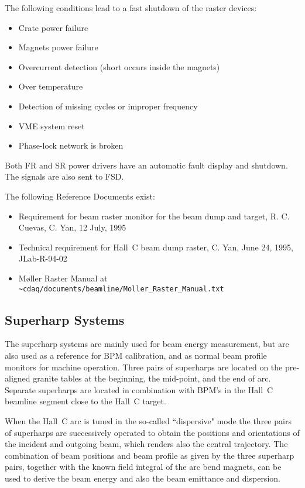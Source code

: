 {The following conditions lead to a fast shutdown of the raster devices:
\begin{itemize}
\item{Crate power failure}
\item{Magnets power failure}
\item{Overcurrent detection (short occurs inside the magnets)}
\item{Over temperature}
\item{Detection of missing cycles or improper frequency}
\item{VME system reset}
\item{Phase-lock network is broken}
\end{itemize}

\noindent Both FR and SR power drivers have an automatic fault display and
shutdown. The signals are also sent to FSD.

The following Reference Documents exist:
\begin{itemize}
\item{Requirement for beam raster monitor for the beam dump and target,
R. C. Cuevas, C. Yan, 12 July, 1995}
\item{Technical requirement for Hall~C beam dump raster,
C. Yan, June 24, 1995, JLab-R-94-02}
\item{M\o ller Raster Manual at \nolinkurl{~cdaq/documents/beamline/Moller_Raster_Manual.txt}}
\end{itemize}
}%
\subsection{Superharp Systems}

The superharp systems are mainly used for beam energy measurement,
but are also used as a reference for BPM calibration, and as
normal beam profile monitors for machine operation. Three pairs
of superharps are located on the pre-aligned granite tables at the
beginning, the mid-point, and the end of arc.
Separate superharps are located in combination with BPM's in the
Hall~C beamline segment close to the Hall~C target.

When the Hall~C arc is tuned in the so-called ``dispersive" mode
the three pairs of superharps are successively operated to obtain
the positions and orientations of the incident and outgoing beam,
which renders also the central trajectory. The combination of
beam positions and beam profile as given by the three superharp
pairs, together with the known field integral of the arc bend
magnets, can be used to derive the beam energy and also the beam
emittance and dispersion.

